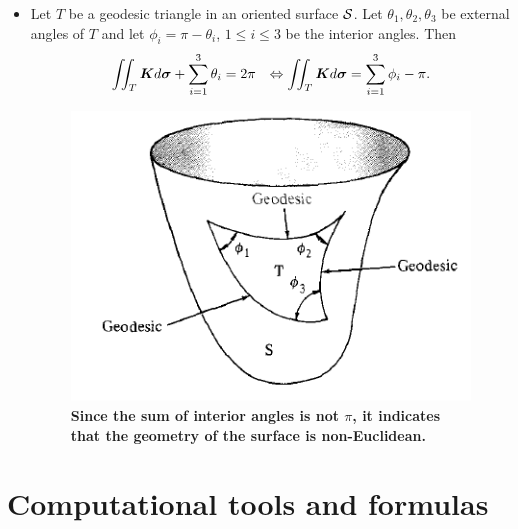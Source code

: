\documentclass[11pt]{article}
\begin{document}
\begin{itemize}
\item \begin{corollary}
Let $T$ be a geodesic triangle in an oriented surface ${\mathcal S}$. Let $\theta_{1}, \theta_{2}, \theta_{3}$ be external angles of $T$ and let $\phi_{i}= \pi- \theta_{i}$, $1\le i\le 3$ be the interior angles. Then 
\begin{align*}
\iint_{T}\boldsymbol{K}d\boldsymbol{\sigma} +  \sum_{i=1}^{3}\theta_{i} = 2\pi &&\Leftrightarrow \iint_{T}\boldsymbol{K}d\boldsymbol{\sigma}= \sum_{i=1}^{3}\phi_{i} - \pi.
\end{align*} 
\begin{figure}[htb]
\centering
 \centerline{\includegraphics[scale = 0.4]{Gauss_Bonnet_triangle.png}}
 \caption{\scriptsize{\textbf{Since the sum of interior angles is not $\pi$, it indicates that the geometry of the surface is non-Euclidean. }}}\label{fig: external_angle}
\end{figure}
\end{corollary}
\end{itemize}

\newpage
\section{Computational tools and formulas}
\end{document}
